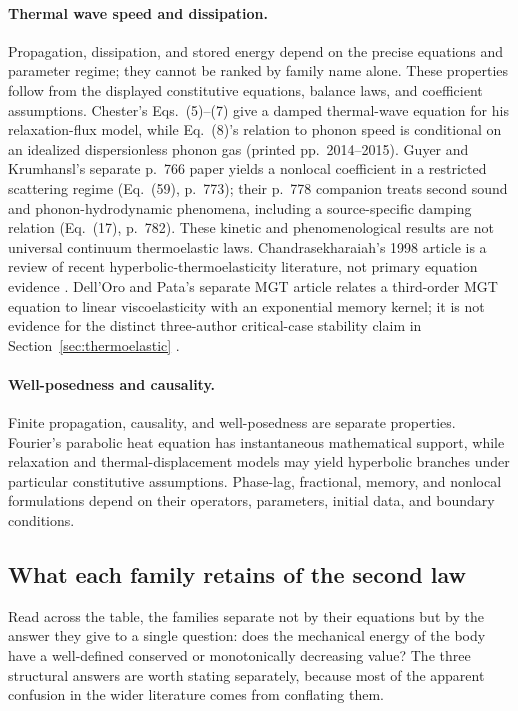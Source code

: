 \paragraph{Thermal wave speed and dissipation.}
Propagation, dissipation, and stored energy depend on the precise equations and parameter regime; they cannot be ranked by family name alone. These properties follow from the displayed constitutive equations, balance laws, and coefficient assumptions. Chester's Eqs.~(5)--(7) give a damped thermal-wave equation for his relaxation-flux model, while Eq.~(8)'s relation to phonon speed is conditional on an idealized dispersionless phonon gas (printed pp.~2014--2015). Guyer and Krumhansl's separate p.~766 paper yields a nonlocal coefficient in a restricted scattering regime (Eq.~(59), p.~773); their p.~778 companion treats second sound and phonon-hydrodynamic phenomena, including a source-specific damping relation (Eq.~(17), p.~782). These kinetic and phenomenological results are not universal continuum thermoelastic laws. Chandrasekharaiah's 1998 article is a review of recent hyperbolic-thermoelasticity literature, not primary equation evidence \cite{Chester1963,GuyerKrumhansl1966,GuyerKrumhansl1966II,Chandrasekharaiah1998}. Dell'Oro and Pata's separate MGT article relates a third-order MGT equation to linear viscoelasticity with an exponential memory kernel; it is not evidence for the distinct three-author critical-case stability claim in Section~\ref{sec:thermoelastic} \cite{DellOroPata2016Viscoelasticity}.

\paragraph{Well-posedness and causality.}
Finite propagation, causality, and well-posedness are separate properties. Fourier's parabolic heat equation has instantaneous mathematical support, while relaxation and thermal-displacement models may yield hyperbolic branches under particular constitutive assumptions. Phase-lag, fractional, memory, and nonlocal formulations depend on their operators, parameters, initial data, and boundary conditions.

\subsection{What each family retains of the second law}
\label{sec:12.2}

Read across the table, the families separate not by their equations but by the answer they give to a single question: does the mechanical energy of the body have a well-defined conserved or monotonically decreasing value? The three structural answers are worth stating separately, because most of the apparent confusion in the wider literature comes from conflating them.

